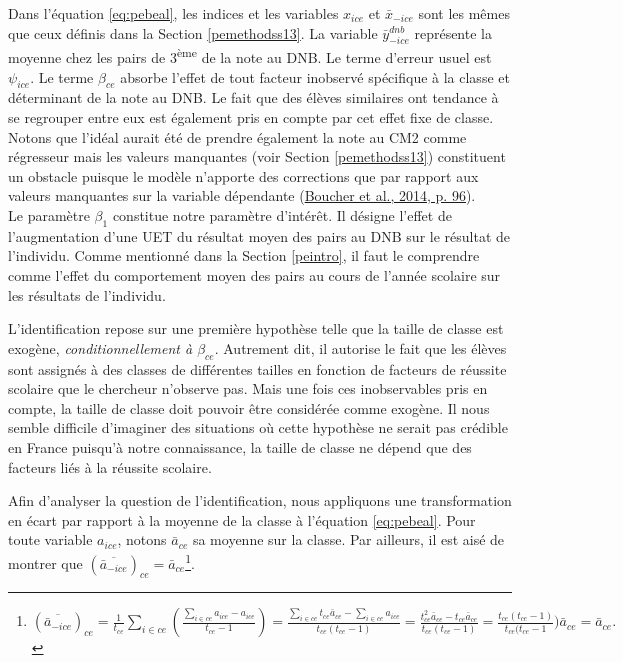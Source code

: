 \documentclass[
]{book}
\begin{document}
Dans l'équation \eqref{eq:pebeal}, les indices et les variables \(x_{ice}\) et \(\bar{x}_{-ice}\) sont les mêmes que ceux définis dans la Section \ref{pemethodss13}. La variable \(\bar{y}^{dnb}_{-ice}\) représente la moyenne chez les pairs de 3\textsuperscript{ème} de la note au DNB. Le terme d'erreur usuel est \(\psi_{ice}\). Le terme \(\beta_{ce}\) absorbe l'effet de tout facteur inobservé spécifique à la classe et déterminant de la note au DNB. Le fait que des élèves similaires ont tendance à se regrouper entre eux est également pris en compte par cet effet fixe de classe. Notons que l'idéal aurait été de prendre également la note au CM2 comme régresseur mais les valeurs manquantes (voir Section \ref{pemethodss13}) constituent un obstacle puisque le modèle n'apporte des corrections que par rapport aux valeurs manquantes sur la variable dépendante (\protect\hyperlink{ref-BOU:eal:14}{Boucher et al., 2014, p. 96}).\\
Le paramètre \(\beta_1\) constitue notre paramètre d'intérêt. Il désigne l'effet de l'augmentation d'une UET du résultat moyen des pairs au DNB sur le résultat de l'individu. Comme mentionné dans la Section \ref{peintro}, il faut le comprendre comme l'effet du comportement moyen des pairs au cours de l'année scolaire sur les résultats de l'individu.

\quad L'identification repose sur une première hypothèse telle que la taille de classe est exogène, \emph{conditionnellement à \(\beta_{ce}\)}. Autrement dit, il autorise le fait que les élèves sont assignés à des classes de différentes tailles en fonction de facteurs de réussite scolaire que le chercheur n'observe pas. Mais une fois ces inobservables pris en compte, la taille de classe doit pouvoir être considérée comme exogène. Il nous semble difficile d'imaginer des situations où cette hypothèse ne serait pas crédible en France puisqu'à notre connaissance, la taille de classe ne dépend que des facteurs liés à la réussite scolaire.

\quad Afin d'analyser la question de l'identification, nous appliquons une transformation en écart par rapport à la moyenne de la classe à l'équation \eqref{eq:pebeal}. Pour toute variable \(a_{ice}\), notons \(\bar{a}_{ce}\) sa moyenne sur la classe. Par ailleurs, il est aisé de montrer que \((\overline{\bar{a}_{-ice}})_{ce} = \bar{a}_{ce}\)\footnote{\((\overline{\bar{a}_{-ice}})_{ce} = \frac{1}{t_{ce}} \displaystyle\sum_{i \in ce} (\frac{\displaystyle\sum_{i \in ce} a_{ice} - a_{ice}}{t_{ce} - 1}) = \frac{\displaystyle\sum_{i \in ce} t_{ce} \bar{a}_{ce} - \displaystyle\sum_{i \in ce} a_{ice}}{t_{ce}(t_{ce} - 1)} = \frac{t_{ce}^2 \bar{a}_{ce} - t_{ce} \bar{a}_{ce}}{t_{ce} (t_{ce} - 1)} = \frac{t_{ce} (t_{ce} - 1)}{t_{ce}(t_{ce} - 1}) \bar{a}_{ce} = \bar{a}_{ce}.\)}.
\end{document}
